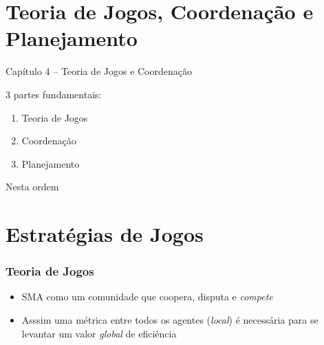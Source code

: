 
\section{Teoria de Jogos, Coordenação e Planejamento}
\begin{frame}

\begin{center}
{\huge Capítulo 4 -- Teoria de Jogos e  Coordenação}

3 partes fundamentais:

\begin{enumerate}
  \item Teoria de Jogos
  \item Coordenação
  \item Planejamento
\end{enumerate}
Nesta ordem
\end{center}

\end{frame}





\section{Estratégias de Jogos}
\begin{frame}

    \frametitle{Teoria de Jogos}
    \begin{itemize}
    \pause
      \item SMA como um comunidade que coopera, disputa e \textit{compete} 
      \pause
      \item Asssim uma métrica entre todos os agentes (\textit{local}) é necessária para
      se levantar um valor \textit{global} de eficiência
    
    \end{itemize}
\end{frame}





